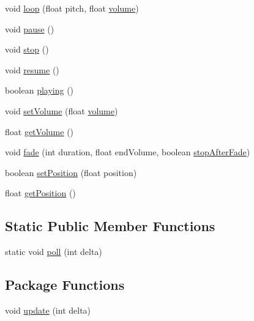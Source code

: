 \begin{DoxyCompactItemize}
\item 
void \mbox{\hyperlink{classorg_1_1newdawn_1_1slick_1_1_music_a7271654211e5d63c0a50b8ed7605a3a5}{loop}} (float pitch, float \mbox{\hyperlink{classorg_1_1newdawn_1_1slick_1_1_music_a2fa10b80767b1a05925e1dc89a088e90}{volume}})
\item 
void \mbox{\hyperlink{classorg_1_1newdawn_1_1slick_1_1_music_a1161bc6fe6a0ba7ab6284758b0a8306d}{pause}} ()
\item 
void \mbox{\hyperlink{classorg_1_1newdawn_1_1slick_1_1_music_a2094f4ed0c3ed404540cebddc6f266d4}{stop}} ()
\item 
void \mbox{\hyperlink{classorg_1_1newdawn_1_1slick_1_1_music_ac5a48d3b0d207d3740220190f4384033}{resume}} ()
\item 
boolean \mbox{\hyperlink{classorg_1_1newdawn_1_1slick_1_1_music_a20709d497ca9027d874f7ffe970ce738}{playing}} ()
\item 
void \mbox{\hyperlink{classorg_1_1newdawn_1_1slick_1_1_music_ac80cc7fda5ba80437bf1ea6efdc3f1a7}{set\+Volume}} (float \mbox{\hyperlink{classorg_1_1newdawn_1_1slick_1_1_music_a2fa10b80767b1a05925e1dc89a088e90}{volume}})
\item 
float \mbox{\hyperlink{classorg_1_1newdawn_1_1slick_1_1_music_a834f88da09d93163e857587c4e2908f6}{get\+Volume}} ()
\item 
void \mbox{\hyperlink{classorg_1_1newdawn_1_1slick_1_1_music_afe49947375cd732f2944cfb5d0ea6a47}{fade}} (int duration, float end\+Volume, boolean \mbox{\hyperlink{classorg_1_1newdawn_1_1slick_1_1_music_af40d098a3f18a0235d9daab0844edf7a}{stop\+After\+Fade}})
\item 
boolean \mbox{\hyperlink{classorg_1_1newdawn_1_1slick_1_1_music_add55814269790879af02e9ce4309f26d}{set\+Position}} (float position)
\item 
float \mbox{\hyperlink{classorg_1_1newdawn_1_1slick_1_1_music_ae565f77bca4ad79f367d6abd90488b26}{get\+Position}} ()
\end{DoxyCompactItemize}
\subsection*{Static Public Member Functions}
\begin{DoxyCompactItemize}
\item 
static void \mbox{\hyperlink{classorg_1_1newdawn_1_1slick_1_1_music_af4cdd167509843b9afe9afecbc591217}{poll}} (int delta)
\end{DoxyCompactItemize}
\subsection*{Package Functions}
\begin{DoxyCompactItemize}
\item 
void \mbox{\hyperlink{classorg_1_1newdawn_1_1slick_1_1_music_a93a114f3bdb3751b6df3650e5993cf13}{update}} (int delta)
\end{DoxyCompactItemize}
